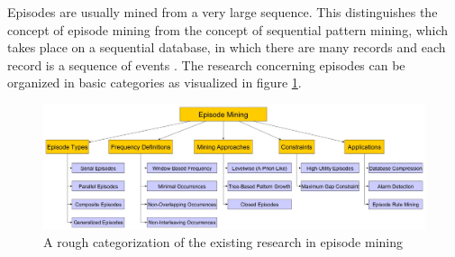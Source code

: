 Episodes are usually mined from a very large sequence. This distinguishes the concept of episode mining from the concept of sequential pattern mining, which takes place on a sequential database, in which there are many records and each record is a sequence of events \cite{wu2013mining}.
The research concerning episodes can be organized in basic categories as visualized in figure \ref{fig_episodeOverview}.

\begin{figure}[h]
	\centering
  	\includegraphics[width=\textwidth]{episodeOverview}
	\caption[Episode Mining Overview]{A rough categorization of the existing research in episode mining}
	\label{fig_episodeOverview}
\end{figure}

